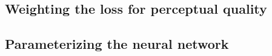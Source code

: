 

\subsection{Weighting the loss for perceptual quality}

\subsection{Parameterizing the neural network}

